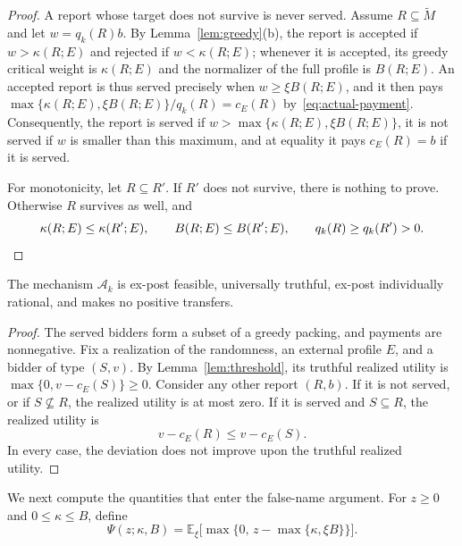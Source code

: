 \documentclass[format=acmsmall, review=false]{acmart}
\newcommand{\E}{\mathbb{E}}
\begin{document}
\begin{proof}
A report whose target does not survive is never served. Assume
\(R\subseteq\widetilde M\) and let \(w=q_k(R)b\). By
Lemma~\ref{lem:greedy}(b), the report is accepted if
\(w>\kappa(R;E)\) and rejected if \(w<\kappa(R;E)\); whenever it
is accepted, its greedy critical weight is \(\kappa(R;E)\) and
the normalizer of the full profile is \(B(R;E)\). An accepted
report is thus served precisely when \(w\ge\xi B(R;E)\), and it
then pays
\(\max\{\kappa(R;E),\xi B(R;E)\}/q_k(R)=c_E(R)\)
by~\eqref{eq:actual-payment}. Consequently, the report is served
if \(w>\max\{\kappa(R;E),\xi B(R;E)\}\), it is not served if
\(w\) is smaller than this maximum, and at equality it pays
\(c_E(R)=b\) if it is served.

For monotonicity, let \(R\subseteq R'\). If \(R'\) does not
survive, there is nothing to prove. Otherwise \(R\) survives as
well, and
\[
\kappa(R;E)\le\kappa(R';E),
\qquad
B(R;E)\le B(R';E),
\qquad
q_k(R)\ge q_k(R')>0.
\qedhere
\]
\end{proof}

\begin{proposition}
\label{prop:universal}
The mechanism \(\mathcal A_k\) is ex-post feasible, universally
truthful, ex-post individually rational, and makes no positive
transfers.
\end{proposition}

\begin{proof}
The served bidders form a subset of a greedy packing, and
payments are nonnegative. Fix a realization of the randomness,
an external profile \(E\), and a bidder of type \((S,v)\). By
Lemma~\ref{lem:threshold}, its truthful realized utility is
\(\max\{0,v-c_E(S)\}\ge0\). Consider any other report \((R,b)\).
If it is not served, or if \(S\not\subseteq R\), the realized
utility is at most zero. If it is served and \(S\subseteq R\),
the realized utility is
\[
v-c_E(R)\le v-c_E(S).
\]
In every case, the deviation does not improve upon the truthful
realized utility.
\end{proof}

We next compute the quantities that enter the false-name
argument. For \(z\ge0\) and \(0\le\kappa\le B\), define
\begin{equation}\label{eq:utility}
\Psi(z;\kappa,B)
=\E_\xi\bigl[\max\{0,\,z-\max\{\kappa,\xi B\}\}\bigr].
\end{equation}
\end{document}
